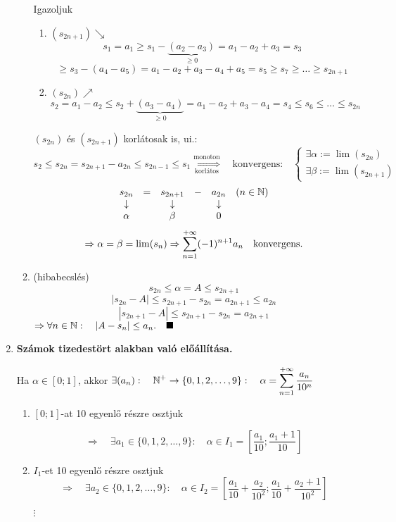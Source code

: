 \documentclass[a4paper,11.5pt]{article}
\begin{document}
\begin{enumerate}
\begin{enumerate}
			Igazoljuk 
			\begin{enumerate}
				\item $(s_{2n+1})\searrow$
				\[ s_1=a_1\geq s_1-\underbrace{(a_2-a_3)}_{\geq 0}=a_1-a_2+a_3=s_3 \]
				\[ \geq s_3-(a_4-a_5)=a_1-a_2+a_3-a_4+a_5=s_5\geq s_7 \geq\ldots\geq s_{2n+1} \]
				\item $(s_{2n})\nearrow$
				\[ s_2=a_1-a_2\leq s_2+\underbrace{(a_3-a_4)}_{\geq 0}=a_1-a_2+a_3-a_4=s_4\leq s_6\leq\ldots\leq s_{2n} \]
			\end{enumerate}
			$(s_{2n})$ és $(s_{2n+1})$ korlátosak is, ui.: \[s_2\leq s_{2n}=s_{2n+1}-a_{2n}\leq s_{2n-1} \leq s_1 \overset{\text{monoton}}{\underset{\text{korlátos}}{\Longrightarrow}} \quad\text{konvergens:}\quad
			\left\{\begin{gathered}
			\exists \alpha:=\lim(s_{2n})\\				
			\exists \beta:=\lim(s_{2n+1})
			\end{gathered}\right. \]
			\[ \begin{matrix}
			s_{2n}&=&s_{2n+1}&-&a_{2n}& (n\in \mathbb{N})\\
			\downarrow&&\downarrow&&\downarrow&\\
			\alpha&&\beta&&0&
			\end{matrix} \]
			\[\Rightarrow \alpha=\beta=\lim(s_n) \Rightarrow\displaystyle\sum_{n=1}^{+\infty}(-1)^{n+1}a_n \quad\text{konvergens.} \]
			\item (hibabecslés)
			\[ s_{2n}\leq\alpha= A\leq s_{2n+1} \]
			\[ |s_{2n}-A|\leq s_{2n+1}-s_{2n}=a_{2n+1}\leq a_{2n} \]
			\[ |s_{2n+1}-A|\leq s_{2n+1}-s_{2n}=a_{2n+1} \]
			$\Rightarrow \forall n\in \mathbb{N}: \quad |A-s_n|\leq a_n. \quad \blacksquare$
		\end{enumerate}
		
		\item \textbf{Számok tizedestört alakban való előállítása.}
		
		Ha $\alpha\in[0;1]$, akkor $\displaystyle\exists (a_n):\quad \mathbb{N}^+\to\{0,1,2,\ldots,9\}: \quad \alpha=\displaystyle\sum_{n=1}^{+\infty} \frac{a_n}{10^n}$
		
		\biz
		\begin{enumerate}[1. lépés:]
			\item $[0;1]$-at 10 egyenlő részre osztjuk
			
			\[\Rightarrow\quad \exists a_1\in\{0,1,2,\ldots,9\}:\quad \alpha \in I_1=\left[\frac{a_1}{10};\frac{a_1+1}{10}\right]\]
			
			\item $I_1$-et 10 egyenlő részre osztjuk
			\[\Rightarrow\quad\exists a_2\in\{0,1,2,\ldots,9\}:\quad \alpha \in I_2=\left[\frac{a_1}{10}+\frac{a_2}{10^2};\frac{a_1}{10}+\frac{a_2+1}{10^2}\right]\]
			\begin{center}
				$\vdots$
			\end{center}
			

\end{enumerate}
\end{enumerate}
\end{document}
